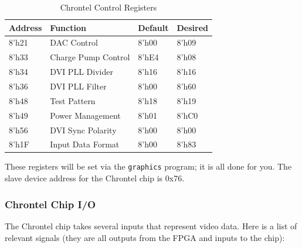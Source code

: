 \documentclass[11pt]{article}
\begin{document}
\begin{table}[H]
	\begin{center}
		\caption{Chrontel Control Registers}
		\label{chrontel_registers}
		\begin{tabular}{l l l l}
			\toprule
			\textbf{Address} & \textbf{Function} & \textbf{Default} & \textbf{Desired} \\
			\midrule
			8'h21 & DAC Control & 8'h00 & 8'h09 \\
			8'h33 & Charge Pump Control & 8'hE4 & 8'h08 \\
			8'h34 & DVI PLL Divider & 8'h16 & 8'h16 \\
			8'h36 & DVI PLL Filter & 8'h00 & 8'h60 \\
			8'h48 & Test Pattern & 8'h18 & 8'h19 \\
			8'h49 & Power Management & 8'h01 & 8'hC0 \\
			8'h56 & DVI Sync Polarity & 8'h00 & 8'h00 \\
			8'h1F & Input Data Format & 8'h00 & 8'h83 
		\end{tabular}
	\end{center}
\end{table}

These registers will be set via the \verb|graphics| program; it is all done for you. The slave device address for the Chrontel chip is 0x76.

\subsubsection{Chrontel Chip I/O}
The Chrontel chip takes several inputs that represent video data. Here is a list of relevant signals (they are all outputs from the FPGA and inputs to the chip):
\end{document}
